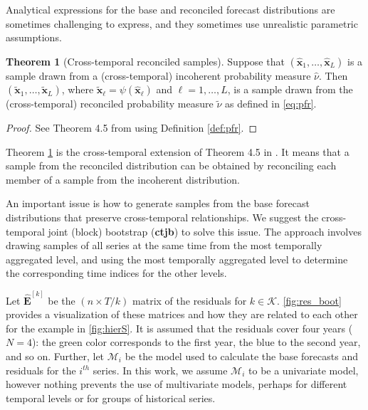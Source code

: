 \documentclass[a4paper,11pt]{article}
\newcommand{\xvet}{\bm{x}}
\newcommand{\Evet}{\bm{E}}
\theoremstyle{definition}
\newtheorem{theorem}{Theorem}[section]
\begin{document}
Analytical expressions for the base and reconciled forecast distributions are sometimes challenging to express, and they sometimes use unrealistic parametric assumptions.

\begin{theorem}[Cross-temporal reconciled samples] \label{thm:rs}
	Suppose that $(\widehat{\xvet}_1, \dots, \widehat{\xvet}_L)$ is a sample drawn from a (cross-temporal) incoherent probability measure $\widehat{\nu}$. Then $(\widetilde{\xvet}_1, \dots, \widetilde{\xvet}_L)$, where $\widetilde{\xvet}_\ell=\psi(\widehat{\xvet}_\ell)$ and $\ell= 1, \dots, L$, is a sample drawn from the (cross-temporal) reconciled probability measure $\widetilde{\nu}$ as defined in \eqref{eq:pfr}.
\end{theorem}
\begin{proof}
	See Theorem 4.5 from \cite{panagiotelis2023} using Definition \ref{def:pfr}.
\end{proof}
Theorem \ref{thm:rs} is the cross-temporal extension of Theorem 4.5 in \cite{panagiotelis2023}. It means that a sample from the reconciled distribution can be obtained by reconciling each member of a sample from the incoherent distribution.

An important issue is how to generate samples from the base forecast distributions that preserve cross-temporal relationships. We suggest the cross-temporal joint (block) bootstrap (\textbf{ctjb}) to solve this issue. The approach involves drawing samples of all series at the same time from the most temporally aggregated level, and using the most temporally aggregated level to determine the corresponding time indices for the other levels.

Let $\widehat{\Evet}^{[k]}$ be the $(n \times T/k)$ matrix of the residuals for $k \in \mathcal{K}$. \autoref{fig:res_boot} provides a visualization of these matrices and how they are related to each other for the example in \autoref{fig:hierS}. It is assumed that the residuals cover four years ($N=4$): the green color corresponds to the first year, the blue to the second year, and so on. Further, let $\mathcal{M}_i$ be the model used to calculate the base forecasts and residuals for the $i^{th}$ series. In this work, we assume $\mathcal{M}_i$ to be a univariate model, however nothing prevents the use of multivariate models, perhaps for different temporal levels or for groups of historical series.




\end{document}
